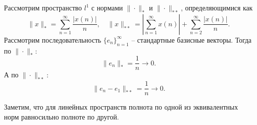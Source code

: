 \begin{example}
    Рассмотрим пространство $l^1$ с нормами $\|\cdot\|_*$ и $\|\cdot\|_{**}$, определяющимися как
    \[
        \|x\|_* = \sum_{n = 1}^{\infty} \frac{|x(n)|}{n}, \quad \|x\|_{**} = \left|\sum_{n = 1}^{\infty} x(n)\right| + \sum_{n = 2}^{\infty} \frac{|x(n)|}{n}.
    \]
    Рассмотрим последовательность $\{e_n\}_{n = 1}^{\infty}$ -- стандартные базисные векторы.
    Тогда по $\|\cdot\|_{*}\colon$
    \[
        \|e_n\|_{*} = \frac{1}{n} \rightarrow 0.
    \]
    А по $\|\cdot\|_{**}\colon$
    \[
        \|e_n - e_1\|_{**} = \frac{1}{n} \rightarrow 0.
    \]
\end{example}
\begin{note}
    Заметим, что для линейных пространств полнота по одной из эквивалентных норм равносильно полноте по другой.
\end{note}